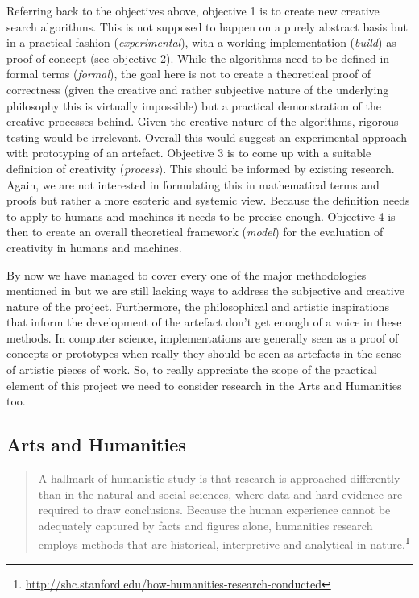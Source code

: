 Referring back to the objectives above, objective 1 is to create new creative search algorithms. This is not supposed to happen on a purely abstract basis but in a practical fashion (\emph{experimental}), with a working implementation (\emph{build}) as proof of concept (see objective 2). While the algorithms need to be defined in formal terms (\emph{formal}), the goal here is not to create a theoretical proof of correctness (given the creative and rather subjective nature of the underlying philosophy this is virtually impossible) but a practical demonstration of the creative processes behind. Given the creative nature of the algorithms, rigorous testing would be irrelevant. Overall this would suggest an experimental approach with prototyping of an artefact. Objective 3 is to come up with a suitable definition of creativity (\emph{process}). This should be informed by existing research. Again, we are not interested in formulating this in mathematical terms and proofs but rather a more esoteric and systemic view. Because the definition needs to apply to humans and machines it needs to be precise enough. Objective 4 is then to create an overall theoretical framework (\emph{model}) for the evaluation of creativity in humans and machines.

By now we have managed to cover every one of the major methodologies mentioned in \autocite{Amaral} but we are still lacking ways to address the subjective and creative nature of the project. Furthermore, the philosophical and artistic inspirations that inform the development of the artefact don't get enough of a voice in these methods. In computer science, implementations are generally seen as a proof of concepts or prototypes when really they should be seen as artefacts in the sense of artistic pieces of work. So, to really appreciate the scope of the practical element of this project we need to consider research in the Arts and Humanities too.


\subsection{Arts and Humanities}



\begin{quotation}
  A hallmark of humanistic study is that research is approached differently than in the natural and social sciences, where data and hard evidence are required to draw conclusions. Because the human experience cannot be adequately captured by facts and figures alone, humanities research employs methods that are historical, interpretive and analytical in nature.\footnote{\url{http://shc.stanford.edu/how-humanities-research-conducted}}
\end{quotation}

